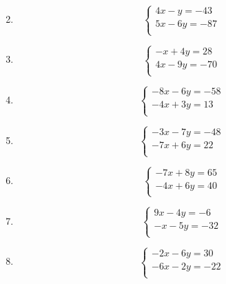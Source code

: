 \documentclass[24 pt]{article}
\begin{document}
\begin{enumerate}
\begin{equation*}
\end{equation*}
\item
\begin{equation*}
\begin{cases}
4x-y=-43\\
5x-6y=-87\\
\end{cases}
\end{equation*}
\item
\begin{equation*}
\begin{cases}
-x+4y=28\\
4x-9y=-70\\
\end{cases}
\end{equation*}
\item
\begin{equation*}
\begin{cases}
-8x-6y=-58\\
-4x+3y=13\\
\end{cases}
\end{equation*}
\item
\begin{equation*}
\begin{cases}
-3x-7y=-48\\
-7x+6y=22\\
\end{cases}
\end{equation*}
\item
\begin{equation*}
\begin{cases}
-7x+8y=65\\
-4x+6y=40\\
\end{cases}
\end{equation*}
\item
\begin{equation*}
\begin{cases}
9x-4y=-6\\
-x-5y=-32\\
\end{cases}
\end{equation*}
\item
\begin{equation*}
\begin{cases}
-2x-6y=30\\
-6x-2y=-22\\
\end{cases}
\end{equation*}

\end{enumerate}
\end{document}
